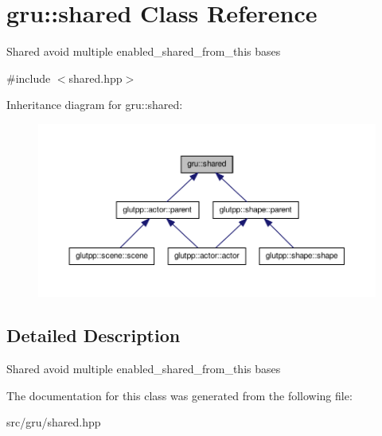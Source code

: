 \hypertarget{classgru_1_1shared}{\section{gru\-:\-:shared \-Class \-Reference}
\label{classgru_1_1shared}
}


\-Shared avoid multiple enabled\-\_\-shared\-\_\-from\-\_\-this bases  




{\ttfamily \#include $<$shared.\-hpp$>$}



\-Inheritance diagram for gru\-:\-:shared\-:\nopagebreak
\begin{figure}[H]
\begin{center}
\leavevmode
\includegraphics[width=350pt]{classgru_1_1shared__inherit__graph}
\end{center}
\end{figure}


\subsection{\-Detailed \-Description}
\-Shared avoid multiple enabled\-\_\-shared\-\_\-from\-\_\-this bases 

\-The documentation for this class was generated from the following file\-:\begin{DoxyCompactItemize}
\item 
src/gru/shared.\-hpp\end{DoxyCompactItemize}
